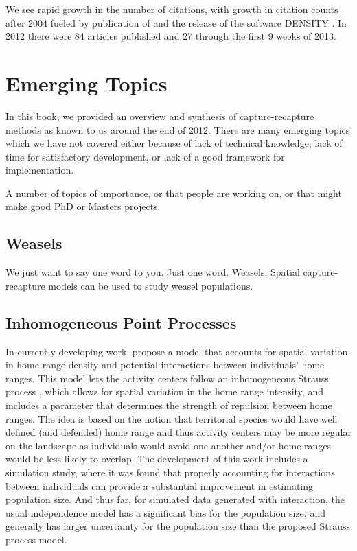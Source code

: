 \begin{table}[ht]
We see rapid growth in the number of citations, 
with growth in citation counts after 2004 fueled by publication of
\citet{efford:2004} and the release of the software DENSITY
\citep{efford_etal:2004}. In 2012 there were 84 articles published and
27 through the first 9 weeks of 2013.




\section{Emerging Topics}


In this book, we provided an overview and synthesis of
capture-recapture methods as known to us around the end of 2012. There
are many emerging topics which we have not covered either because of
lack of technical knowledge, lack of time for satisfactory
development, or lack of a good framework for implementation.

A number of topics of importance, or that people are working on, or
that might make good PhD or Masters projects.

\subsection{Weasels} %

We just want to say one word to you. Just one word. Weasels. Spatial
capture-recapture models can be used to study weasel populations.


\subsection{Inhomogeneous Point Processes}
\label{last.sec.ipp}

In currently developing work, \citet{reich_etal:2012} propose a model
that accounts for spatial variation in home range density and
potential interactions between individuals' home ranges.  This model
lets the activity centers follow an inhomogeneous Strauss process
\citep{strauss:1975}, which allows for spatial variation in the home
range intensity, and includes a parameter that determines the strength
of repulsion between home ranges.  The idea is based on the notion
that territorial species would have well defined (and defended) home
range and thus activity centers may be more regular on the landscape
as individuals would avoid one another and/or home ranges would be
less likely to overlap.  The development of this work includes a
simulation study, where it was found that properly accounting for
interactions between individuals can provide a substantial improvement
in estimating population size.  And thus far, for simulated data
generated with interaction, the usual independence model has a
significant bias for the population size, and generally has larger
uncertainty for the population size than the proposed Strauss process
model.


\end{table}
